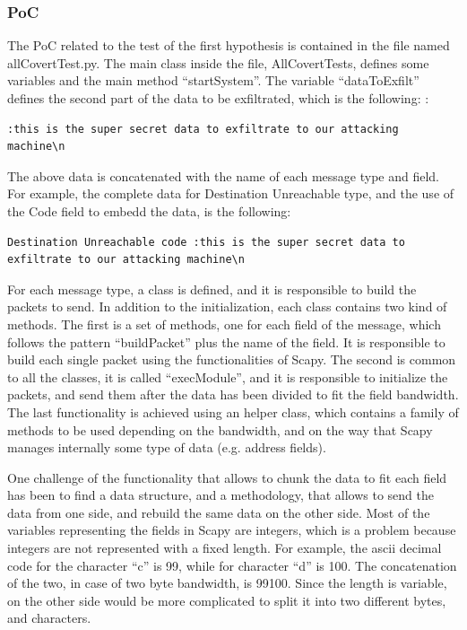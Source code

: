 \documentclass[12pt]{article}
\begin{document}
\subsubsection{PoC}
\label{subsub:poc1}


The PoC related to the test of the first hypothesis is contained in the file named allCovertTest.py. The main class inside the file, AllCovertTests, defines some variables and the main method ``startSystem''. The variable ``dataToExfilt'' defines the second part of the data to be exfiltrated, which is the following: : 

\begin{lstlisting}[style=python,basicstyle=\ttfamily\small]
 :this is the super secret data to exfiltrate to our attacking machine\n
\end{lstlisting}

The above data is concatenated with the name of each message type and field. For example, the complete data for Destination Unreachable type, and the use of the Code field to embedd the data, is the following:
\begin{lstlisting}[style=python,basicstyle=\ttfamily\small]
 Destination Unreachable code :this is the super secret data to exfiltrate to our attacking machine\n
\end{lstlisting}

For each message type, a class is defined, and it is responsible to build the packets to send. In addition to the initialization, each class contains two kind of methods. The first is a set of methods, one for each field of the message, which follows the pattern ``buildPacket'' plus the name of the field. It is responsible to build each single packet using the functionalities of Scapy. The second is common to all the classes, it is called ``execModule'', and it is responsible to initialize the packets, and send them after the data has been divided to fit the field bandwidth. The last functionality is achieved using an helper class, which contains a family of methods to be used depending on the bandwidth, and on the way that Scapy manages internally some type of data (e.g. address fields).

One challenge of the functionality that allows to chunk the data to fit each field has been to find a data structure, and a methodology, that allows to send the data from one side, and rebuild the same data on the other side. Most of the variables representing the fields in Scapy are integers, which is a problem because integers are not represented with a fixed length. For example, the ascii decimal code for the character ``c'' is 99, while for character ``d'' is 100. The concatenation of the two, in case of two byte bandwidth, is 99100. Since the length is variable, on the other side would be more complicated to split it into two different bytes, and characters.
\end{document}
